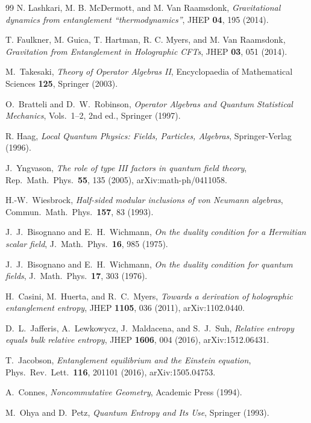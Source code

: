 \begin{thebibliography}{99}
N. Lashkari, M. B. McDermott, and M. Van Raamsdonk, \emph{Gravitational dynamics from entanglement ``thermodynamics''}, JHEP \textbf{04}, 195 (2014).

T. Faulkner, M. Guica, T. Hartman, R. C. Myers, and M. Van Raamsdonk, \emph{Gravitation from Entanglement in Holographic CFTs}, JHEP \textbf{03}, 051 (2014).

M.~Takesaki, \emph{Theory of Operator Algebras II}, Encyclopaedia of Mathematical Sciences \textbf{125}, Springer (2003).

O.~Bratteli and D.~W.~Robinson, \emph{Operator Algebras and Quantum Statistical Mechanics}, Vols.\ 1--2, 2nd ed., Springer (1997).

R. Haag, \emph{Local Quantum Physics: Fields, Particles, Algebras}, Springer-Verlag (1996).

J.~Yngvason, \emph{The role of type III factors in quantum field theory}, Rep.\ Math.\ Phys.\ \textbf{55}, 135 (2005), arXiv:math-ph/0411058.

H.-W.~Wiesbrock, \emph{Half-sided modular inclusions of von Neumann algebras}, Commun.\ Math.\ Phys.\ \textbf{157}, 83 (1993).

J.~J.~Bisognano and E.~H.~Wichmann, \emph{On the duality condition for a Hermitian scalar field}, J.\ Math.\ Phys.\ \textbf{16}, 985 (1975).

J.~J.~Bisognano and E.~H.~Wichmann, \emph{On the duality condition for quantum fields}, J.\ Math.\ Phys.\ \textbf{17}, 303 (1976).

H.~Casini, M.~Huerta, and R.~C.~Myers, \emph{Towards a derivation of holographic entanglement entropy}, JHEP \textbf{1105}, 036 (2011), arXiv:1102.0440.

D.~L.~Jafferis, A.~Lewkowycz, J.~Maldacena, and S.~J.~Suh, \emph{Relative entropy equals bulk relative entropy}, JHEP \textbf{1606}, 004 (2016), arXiv:1512.06431.

T.~Jacobson, \emph{Entanglement equilibrium and the Einstein equation}, Phys.\ Rev.\ Lett.\ \textbf{116}, 201101 (2016), arXiv:1505.04753.

A.~Connes, \emph{Noncommutative Geometry}, Academic Press (1994).

M.~Ohya and D.~Petz, \emph{Quantum Entropy and Its Use}, Springer (1993).


\end{thebibliography}
